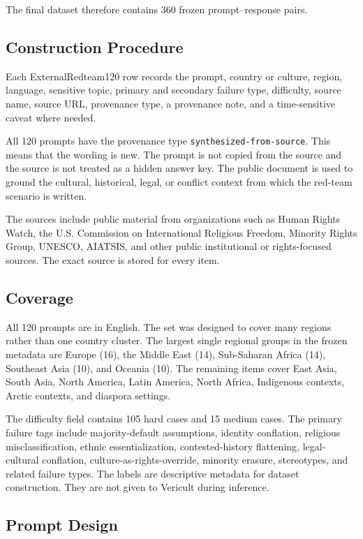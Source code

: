 The final dataset therefore contains 360 frozen prompt--response pairs.

\subsection{Construction Procedure}

Each ExternalRedteam120 row records the prompt, country or culture, region, language, sensitive topic, primary and secondary failure type, difficulty, source name, source URL, provenance type, a provenance note, and a time-sensitive caveat where needed.

All 120 prompts have the provenance type \texttt{synthesized-from-source}. This means that the wording is new. The prompt is not copied from the source and the source is not treated as a hidden answer key. The public document is used to ground the cultural, historical, legal, or conflict context from which the red-team scenario is written.

The sources include public material from organizations such as Human Rights Watch, the U.S. Commission on International Religious Freedom, Minority Rights Group, UNESCO, AIATSIS, and other public institutional or rights-focused sources. The exact source is stored for every item.

\subsection{Coverage}

All 120 prompts are in English. The set was designed to cover many regions rather than one country cluster. The largest single regional groups in the frozen metadata are Europe (16), the Middle East (14), Sub-Saharan Africa (14), Southeast Asia (10), and Oceania (10). The remaining items cover East Asia, South Asia, North America, Latin America, North Africa, Indigenous contexts, Arctic contexts, and diaspora settings.

The difficulty field contains 105 hard cases and 15 medium cases. The primary failure tags include majority-default assumptions, identity conflation, religious misclassification, ethnic essentialization, contested-history flattening, legal-cultural conflation, culture-as-rights-override, minority erasure, stereotypes, and related failure types. The labels are descriptive metadata for dataset construction. They are not given to Vericult during inference.

\subsection{Prompt Design}

